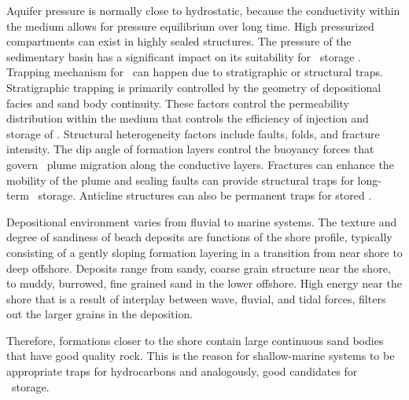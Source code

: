 Aquifer pressure is normally close to hydrostatic, because the conductivity within the medium allows for pressure equilibrium over long time. High pressurized compartments can exist in highly sealed structures. The pressure of the sedimentary basin has a significant impact on its suitability for \coo\ storage \cite{bachu2000sequestration}. Trapping mechanism for \coo\ can happen due to stratigraphic or structural traps. Stratigraphic trapping  is primarily controlled by the geometry of depositional facies and sand body continuity. These factors control the permeability distribution within the medium that controls the efficiency of injection and storage of \coo. Structural heterogeneity factors include faults, folds, and fracture intensity. The dip angle of formation layers control the buoyancy forces that govern \coo\ plume migration along the conductive layers. Fractures can enhance the mobility of the plume and sealing faults can provide structural traps for long-term \coo\ storage. Anticline structures can also be permanent traps for stored \coo.

Depositional environment varies from fluvial to marine systems. The texture and degree of sandiness of beach deposits are functions of the shore profile, typically consisting of a gently sloping formation layering in a transition from near shore to deep offshore. Deposits range from sandy, coarse grain structure near the shore, to muddy, burrowed, fine grained sand in the lower offshore. High energy near the shore that is a result of interplay between wave, fluvial, and tidal forces, filters out the larger grains in the deposition.

Therefore, formations closer to the shore contain large continuous sand bodies that have good quality rock. This is the reason for shallow-marine systems to be appropriate traps for hydrocarbons and analogously, good candidates for \coo\ storage.

